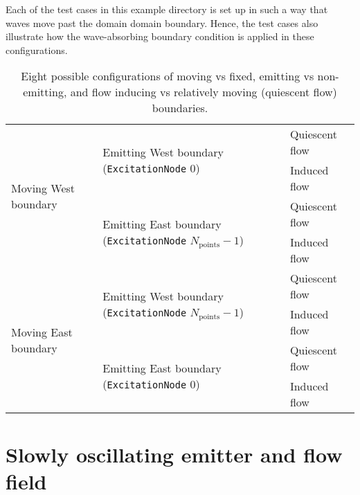 Each of the test cases in this example directory is set up in such a way that waves move past the domain domain boundary. Hence, the test cases also illustrate how the wave-absorbing boundary condition is applied in these configurations.


\begin{table}[htb]
    \centering
    \begin{tabular}{|l|l|l|}
        \hline
        \multirow{4}{*}{Moving West boundary} & \multirow{2}{*}{Emitting West boundary ({\tt ExcitationNode} 0)}                       & Quiescent flow \\
        \cline{3-3}
                                              &                                                                                        & Induced flow   \\
        \cline{2-3}
                                              & \multirow{2}{*}{Emitting East boundary ({\tt ExcitationNode} $N_{\mathrm{points}}-1$)} & Quiescent flow \\
        \cline{3-3}
                                              &                                                                                        & Induced flow   \\
        \cline{1-3}
        \multirow{4}{*}{Moving East boundary} & \multirow{2}{*}{Emitting West boundary ({\tt ExcitationNode} $N_{\mathrm{points}}-1$)} & Quiescent flow \\
        \cline{3-3}
                                              &                                                                                        & Induced flow   \\
        \cline{2-3}
                                              & \multirow{2}{*}{Emitting East boundary ({\tt ExcitationNode} $0$)}                     & Quiescent flow \\
        \cline{3-3}
                                              &                                                                                        & Induced flow   \\
        \hline
    \end{tabular}
    \caption{Eight possible configurations of moving vs fixed, emitting vs non-emitting, and flow inducing vs relatively moving (quiescent flow) boundaries.}
    \label{tab:hierarchyMotion}
\end{table}


\section{Slowly oscillating emitter and flow field}
\label{sec:Slowly oscillating emitter and flow field}


